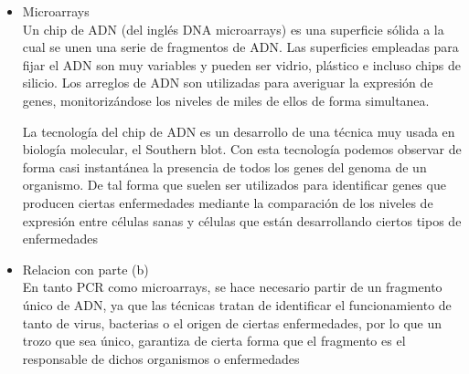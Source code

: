 \begin{enumerate}
\begin{itemize}
\item Microarrays \\

Un chip de ADN (del inglés DNA microarrays) es una superficie sólida a la cual 
se unen una serie de fragmentos de ADN. Las superficies empleadas para fijar el 
ADN son muy variables y pueden ser vidrio, plástico e incluso chips de silicio. 
Los arreglos de ADN son utilizadas para averiguar la expresión de genes, 
monitorizándose los niveles de miles de ellos de forma simultanea.

La tecnología del chip de ADN es un desarrollo de una técnica muy usada en biología 
molecular, el Southern blot. Con esta tecnología podemos observar de forma casi
 instantánea la presencia de todos los genes del genoma de un organismo. De tal
 forma que suelen ser utilizados para identificar genes que producen ciertas 
enfermedades mediante la comparación de los niveles de expresión entre células
 sanas y células que están desarrollando ciertos tipos de enfermedades

\item Relacion con parte (b) \\

En tanto PCR como microarrays, se hace necesario partir de un fragmento único de ADN, ya 
que las técnicas tratan de identificar el funcionamiento de tanto de virus, bacterias o 
el origen de ciertas enfermedades, por lo que un trozo que sea único, garantiza de cierta
 forma que el fragmento es el responsable
de dichos organismos o enfermedades

\end{itemize}

\end{enumerate}
